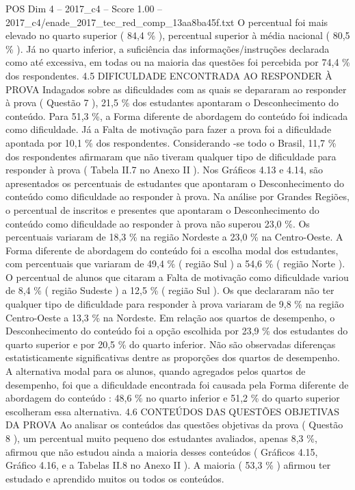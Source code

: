 \begin{textsample}{POS Dim 4 – 2017\_c4 – Score 1.00 – 2017\_c4/enade\_2017\_tec\_red\_comp\_13aa8ba45f.txt}
O percentual foi mais elevado no quarto superior ( 84,4 \% ), percentual superior à média nacional ( 80,5 \% ).
Já no quarto inferior, a suficiência das informações/instruções declarada como até excessiva, em todas ou na maioria das questões foi percebida por 74,4 \% dos respondentes. 4.5 DIFICULDADE ENCONTRADA AO RESPONDER À PROVA Indagados sobre as dificuldades com as quais se depararam ao responder à prova ( Questão 7 ), 21,5 \% dos estudantes apontaram o Desconhecimento do conteúdo.
Para 51,3 \%, a Forma diferente de abordagem do conteúdo foi indicada como dificuldade.
Já a Falta de motivação para fazer a prova foi a dificuldade apontada por 10,1 \% dos respondentes.
Considerando -se todo o Brasil, 11,7 \% dos respondentes afirmaram que não tiveram qualquer tipo de dificuldade para responder à prova ( Tabela II.7 no Anexo II ).
Nos Gráficos 4.13 e 4.14, são apresentados os percentuais de estudantes que apontaram o Desconhecimento do conteúdo como dificuldade ao responder à prova.
Na análise por Grandes Regiões, o percentual de inscritos e presentes que apontaram o Desconhecimento do conteúdo como dificuldade ao responder à prova não superou 23,0 \%.
Os percentuais variaram de 18,3 \% na região Nordeste a 23,0 \% na Centro-Oeste.
A Forma diferente de abordagem do conteúdo foi a escolha modal dos estudantes, com percentuais que variaram de 49,4 \% ( região Sul ) a 54,6 \% ( região Norte ).
O percentual de alunos que citaram a Falta de motivação como dificuldade variou de 8,4 \% ( região Sudeste ) a 12,5 \% ( região Sul ).
Os que declararam não ter qualquer tipo de dificuldade para responder à prova variaram de 9,8 \% na região Centro-Oeste a 13,3 \% na Nordeste.
Em relação aos quartos de desempenho, o Desconhecimento do conteúdo foi a opção escolhida por 23,9 \% dos estudantes do quarto superior e por 20,5 \% do quarto inferior.
Não são observadas diferenças estatisticamente significativas dentre as proporções dos quartos de desempenho.
A alternativa modal para os alunos, quando agregados pelos quartos de desempenho, foi que a dificuldade encontrada foi causada pela Forma diferente de abordagem do conteúdo : 48,6 \% no quarto inferior e 51,2 \% do quarto superior escolheram essa alternativa. 4.6 CONTEÚDOS DAS QUESTÕES OBJETIVAS DA PROVA Ao analisar os conteúdos das questões objetivas da prova ( Questão 8 ), um percentual muito pequeno dos estudantes avaliados, apenas 8,3 \%, afirmou que não estudou ainda a maioria desses conteúdos ( Gráficos 4.15, Gráfico 4.16, e a Tabelas II.8 no Anexo II ).
A maioria ( 53,3 \% ) afirmou ter estudado e aprendido muitos ou todos os conteúdos.

\end{textsample}
